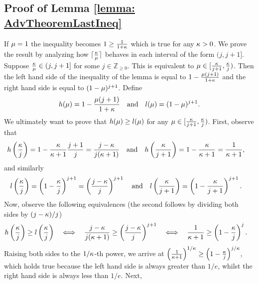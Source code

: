 \subsection{Proof of Lemma \ref{lemma: AdvTheoremLastIneq}}
\label{proofs: AdvTheoremLastIneq}
    If $\mu = 1$ the inequality becomes $1 \geq \frac{1}{1+\kappa}$ which is true for any $\kappa > 0$. We  prove the result by analyzing how $\lceil\frac{\kappa}{\mu}\rceil$ behaves in each interval of the form $(j, j+1]$. %
    Suppose $\frac{\kappa}{\mu} \in (j, j+1]$ for some $j \in \mathbb Z_{\geq 0}$. This is equivalent to $\mu \in [\frac{\kappa}{j+1}, \frac{\kappa}{j})$. Then the left hand side of the inequality of the lemma is equal to $1 - \frac{\mu (j+1)}{1+\kappa}$ and the right hand side is equal to $(1-\mu)^{j+1}$. Define
\begin{align*}
        h(\mu) = 1 - \frac{\mu (j+1)}{1+ \kappa}\quad\text{and}\quad
        l(\mu) = (1-\mu)^{j+1}.
\end{align*}
We ultimately want to prove that $h(\mu) \geq l(\mu)$ for any $\mu \in [\frac{\kappa}{j+1}, \frac{\kappa}{j})$.  First, observe that
\begin{align*}
    h\left( \frac{\kappa}{j} \right) = 1- \frac{\kappa}{\kappa+1} \frac{j+1}{j} = \frac{j-\kappa}{j(\kappa+1)}\quad\text{and}\quad
    h\left( \frac{\kappa}{j+1} \right) &= 1 - \frac{\kappa}{\kappa+1} = \frac{1}{\kappa + 1},
\end{align*}
and similarly
\begin{align*}
    l\left(\frac{\kappa}{j} \right)=\left( 1 - \frac{\kappa}{j} \right)^{j+1} = \left(\frac{j-\kappa}{j}\right)^{j+1}\quad\text{and}\quad    l\left(\frac{\kappa}{j+1} \right)&=\left( 1 - \frac{\kappa}{j+1} \right)^{j+1}.
\end{align*}
Now, observe the following equivalences (the second follows by dividing both sides by $(j-\kappa)/j$)
\begin{align*}
    h\left( \frac{\kappa}{j} \right) \geq l\left( \frac{\kappa}{j} \right) \quad \Longleftrightarrow \quad \frac{j-\kappa}{j(\kappa+1)} \geq \left(\frac{j-\kappa}{j}\right)^{j+1} \quad \Longleftrightarrow \quad \frac{1}{\kappa +1} \geq \left(1-\frac{\kappa}{j}\right)^{j}. \quad 
\end{align*}
Raising both sides to the $1/\kappa$-th power, we arrive at $\left(\frac{1}{\kappa +1}\right)^{1/\kappa} \geq \left(1-\frac{\kappa}{j}\right)^{j/\kappa}$, which holds true because the left hand side is always greater than $1/e$, whilst the right hand side is always less than $1/e$. Next,
